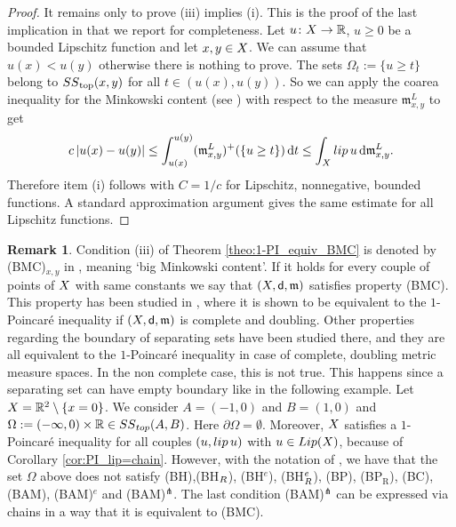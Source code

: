\documentclass[12pt]{amsart}
\newcommand{\R}{\mathbb{R}}
\newcommand{\sfd}{{\sf d}}
\renewcommand{\d}{{\mathrm d}}
\newcommand{\X}{{\rm X}}
\newcommand{\lip}{{\rm lip}}
\newcommand{\Lip}{{\rm Lip}}
\newcommand{\mm}{\mathfrak m}
\renewcommand{\SS}{{\rm SS}}
\theoremstyle{definition}
\newtheorem{remark}[theorem]{Remark}
\begin{document}
\begin{proof}
It remains only to prove (iii) implies (i). This is the proof of the last implication in \cite[Thm.\ 6.1]{CaputoCavallucci2024} that we report for completeness. Let $u\colon \X \to \R$, $u\geq 0$ be a bounded Lipschitz function and let $x,y\in \X$. We can assume that $u(x) < u(y)$ otherwise there is nothing to prove. The sets $\Omega_t := \lbrace u \geq t \rbrace$ belong to $\SS_\text{top}(x,y)$ for all $t\in (u(x),u(y))$. So we can apply the coarea inequality for the Minkowski content (see \cite[Lemma 3.2]{AmbDiMarGig17}) with respect to the measure $\mm_{x,y}^L$ to get
    $$c\, \vert u(x) - u(y) \vert \leq \int_{u(x)}^{u(y)} (\mm_{x,y}^L)^{+}(\lbrace u \geq t \rbrace) \,\d t \leq \int_\X \lip\,u \,\d\mm_{x,y}^L.$$
    Therefore item (i) follows with $C = 1/c$ for Lipschitz, nonnegative, bounded functions. A standard approximation argument gives the same estimate for all Lipschitz functions.
\end{proof}
%
\begin{remark}
    Condition (iii) of Theorem \ref{theo:1-PI_equiv_BMC} is denoted by (BMC)$_{x,y}$ in \cite{CaputoCavallucci2024II}, meaning `big Minkowski content'. If it holds for every couple of points of $\X$ with same constants we say that $(\X,\sfd,\mm)$ satisfies property (BMC). This property has been studied in \cite{CaputoCavallucci2024}, where it is shown to be equivalent to the $1$-Poincaré inequality if $(\X,\sfd, \mm)$ is complete and doubling. Other properties regarding the boundary of separating sets have been studied there, and they are all equivalent to the $1$-Poincaré inequality in case of complete, doubling metric measure spaces. In the non complete case, this is not true. 
    This happens since a separating set can have empty boundary like in the following example. Let $\X=\mathbb{R}^2\setminus \{x=0\}$. We consider $A =(-1,0)$ and $B=(1,0)$ and $\Omega:=(-\infty, 0) \times \mathbb{R} \in {\rm SS}_{\rm top}(A,B)$. Here $\partial \Omega=\emptyset$. Moreover, $\X$ satisfies a $1$-Poincaré inequality for all couples $(u,\lip\,u)$ with $u\in \Lip(\X)$, because of Corollary \ref{cor:PI_lip=chain}.    
    However, with the notation of \cite[Theorem 6.1]{CaputoCavallucci2024}, 
    we have that the set $\Omega$ above does not satisfy (BH),(BH$_\textup{R}$), (BH$^e$), (BH$^e_\textup{R}$), (BP), (BP$_\text{R}$), (BC), (BAM), (BAM)$^e$ and (BAM)$^\pitchfork$. The last condition (BAM)$^\pitchfork$ can be expressed via chains in a way that it is equivalent to (BMC).
\end{remark}
\end{document}
